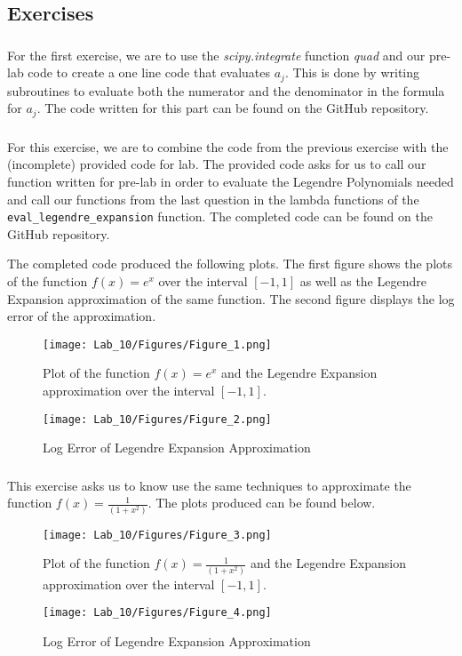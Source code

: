 \documentclass{article}
\begin{document}
\subsection{Exercises}
\subsubsection{}
For the first exercise, we are to use the \textit{scipy.integrate} function \textit{quad} and our pre-lab code to create a one line code that evaluates \(a_j\). This is done by writing subroutines to evaluate both the numerator and the denominator in the formula for \(a_j\). The code written for this part can be found on the GitHub repository. 

\subsubsection{}
For this exercise, we are to combine the code from the previous exercise with the (incomplete) provided code for lab. The provided code asks for us to call our function written for pre-lab in order to evaluate the Legendre Polynomials needed and call our functions from the last question in the lambda functions of the \texttt{eval\_legendre\_expansion} function. The completed code can be found on the GitHub repository.

The completed code produced the following plots. The first figure shows the plots of the function \(f(x) = e^x\) over the interval \([-1,1]\) as well as the Legendre Expansion approximation of the same function. The second figure displays the log error of the approximation.
\begin{figure}[h!]
    \centering
    \texttt{[image: Lab\_10/Figures/Figure\_1.png]}
    \caption{Plot of the function \(f(x)=e^x\) and the Legendre Expansion approximation over the interval \([-1,1]\).}
    \label{fig:legendre}
\end{figure}
\begin{figure}[h!]
    \centering
    \texttt{[image: Lab\_10/Figures/Figure\_2.png]}
    \caption{Log Error of Legendre Expansion Approximation}
    \label{fig:legendre_err}
\end{figure}

\subsubsection{}
This exercise asks us to know use the same techniques to approximate the function \(f(x) = \frac{1}{(1+x^2)}\). The plots produced can be found below.
\begin{figure}[h!]
    \centering
    \texttt{[image: Lab\_10/Figures/Figure\_3.png]}
    \caption{Plot of the function \(f(x)=\frac{1}{(1+x^2)}\) and the Legendre Expansion approximation over the interval \([-1,1]\).}
    \label{fig:legendre2}
\end{figure}
\begin{figure}[h!]
    \centering
    \texttt{[image: Lab\_10/Figures/Figure\_4.png]}
    \caption{Log Error of Legendre Expansion Approximation}
    \label{fig:legendre2_err}
\end{figure}
\end{document}
